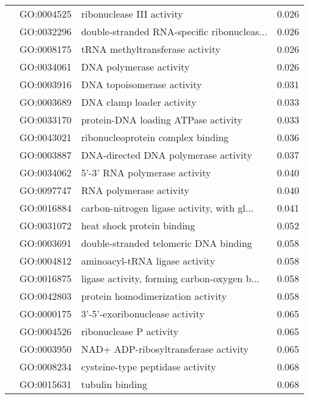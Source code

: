 \begin{longtable}{lllr}
   & GO:0004525 &                    ribonuclease III activity &         0.026 \\
   & GO:0032296 &  double-stranded RNA-specific ribonucleas... &         0.026 \\
   & GO:0008175 &              tRNA methyltransferase activity &         0.026 \\
   & GO:0034061 &                      DNA polymerase activity &         0.026 \\
   & GO:0003916 &                   DNA topoisomerase activity &         0.031 \\
   & GO:0003689 &                    DNA clamp loader activity &         0.033 \\
   & GO:0033170 &          protein-DNA loading ATPase activity &         0.033 \\
   & GO:0043021 &            ribonucleoprotein complex binding &         0.036 \\
   & GO:0003887 &         DNA-directed DNA polymerase activity &         0.037 \\
   & GO:0034062 &                5'-3' RNA polymerase activity &         0.040 \\
   & GO:0097747 &                      RNA polymerase activity &         0.040 \\
   & GO:0016884 &  carbon-nitrogen ligase activity, with gl... &         0.041 \\
   & GO:0031072 &                   heat shock protein binding &         0.052 \\
   & GO:0003691 &        double-stranded telomeric DNA binding &         0.058 \\
   & GO:0004812 &               aminoacyl-tRNA ligase activity &         0.058 \\
   & GO:0016875 &  ligase activity, forming carbon-oxygen b... &         0.058 \\
   & GO:0042803 &            protein homodimerization activity &         0.058 \\
   & GO:0000175 &               3'-5'-exoribonuclease activity &         0.065 \\
   & GO:0004526 &                      ribonuclease P activity &         0.065 \\
   & GO:0003950 &         NAD+ ADP-ribosyltransferase activity &         0.065 \\
   & GO:0008234 &             cysteine-type peptidase activity &         0.068 \\
   & GO:0015631 &                              tubulin binding &         0.068 \\

\end{longtable}
